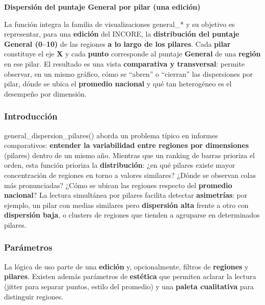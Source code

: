 \documentclass[
  11pt,
  letterpaper,
  DIV=11,
  numbers=noendperiod]{scrartcl}
\begin{document}
\textbf{Dispersión del puntaje General por pilar (una edición)}

La función integra la familia de visualizaciones general\_* y su
objetivo es representar, para una \textbf{edición} del INCORE, la
\textbf{distribución del puntaje General (0--10)} de las regiones
\textbf{a lo largo de los pilares}. Cada \textbf{pilar} constituye el
eje \textbf{X} y cada \textbf{punto} corresponde al puntaje
\textbf{General} de una \textbf{región} en ese pilar. El resultado es
una vista \textbf{comparativa y transversal}: permite observar, en un
mismo gráfico, cómo se ``abren'' o ``cierran'' las dispersiones por
pilar, dónde se ubica el \textbf{promedio nacional} y qué tan
heterogéneo es el desempeño por dimensión.

\subsubsection{\texorpdfstring{\textbf{Introducción}}{Introducción}}\label{introducciuxf3n-3}

general\_dispersion\_pilares() aborda un problema típico en informes
comparativos: \textbf{entender la variabilidad entre regiones por
dimensiones} (pilares) dentro de un mismo año. Mientras que un ranking
de barras prioriza el orden, esta función prioriza la
\textbf{distribución}: ¿en qué pilares existe mayor concentración de
regiones en torno a valores similares? ¿Dónde se observan colas más
pronunciadas? ¿Cómo se ubican las regiones respecto del \textbf{promedio
nacional}? La lectura simultánea por pilares facilita detectar
\textbf{asimetrías}: por ejemplo, un pilar con medias similares pero
\textbf{dispersión alta} frente a otro con \textbf{dispersión baja}, o
clusters de regiones que tienden a agruparse en determinados pilares.

\subsubsection{\texorpdfstring{\textbf{Parámetros}}{Parámetros}}\label{paruxe1metros-2}

La lógica de uso parte de una \textbf{edición} y, opcionalmente, filtros
de \textbf{regiones} y \textbf{pilares}. Existen además parámetros de
\textbf{estética} que permiten aclarar la lectura (jitter para separar
puntos, estilo del promedio) y una \textbf{paleta cualitativa} para
distinguir regiones.
\end{document}
